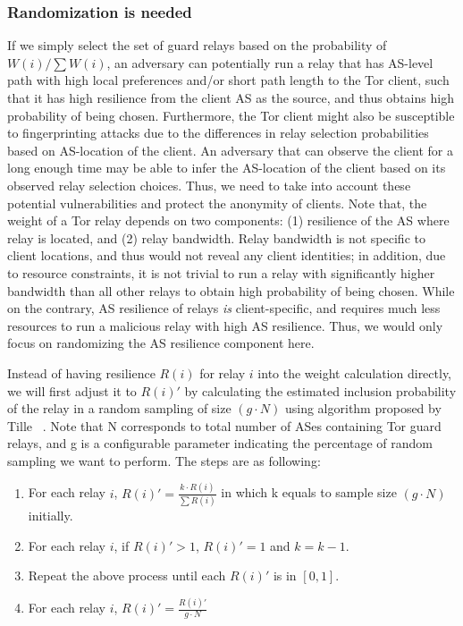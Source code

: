 \subsubsection{Randomization is needed}
\label{relay_randomization}
If we simply select the set of guard relays based on the probability of $W(i)/\sum W(i)$, an adversary can potentially run a relay that has AS-level path with high local preferences and/or short path length to the Tor client, such that it has high resilience from the client AS as the source, and thus obtains high probability of being chosen. Furthermore, the Tor client might also be susceptible to fingerprinting attacks due to the differences in relay selection probabilities based on AS-location of the client. An adversary that can observe the client for a long enough time may be able to infer the AS-location of the client based on its observed relay selection choices. Thus, we need to take into account these potential vulnerabilities and protect the anonymity of clients. Note that, the weight of a Tor relay depends on two components: (1) resilience of the AS where relay is located, and (2) relay bandwidth. Relay bandwidth is not specific to client locations, and thus would not reveal any client identities; in addition, due to resource constraints, it is not trivial to run a relay with significantly higher bandwidth than all other relays to obtain high probability of being chosen. While on the contrary, AS resilience of relays \emph{is} client-specific, and requires much less resources to run a malicious relay with high AS resilience. Thus, we would only focus on randomizing the AS resilience component here. 

Instead of having resilience $R(i)$ for relay $i$ into the weight calculation directly, we will first adjust it to $R(i)\prime$ by calculating the estimated inclusion probability of the relay in a random sampling of size $(g \cdot N)$ using algorithm proposed by Tille ~\cite{tille1996elimination}. Note that N corresponds to total number of ASes containing Tor guard relays, and g is a configurable parameter indicating the percentage of random sampling we want to perform. The steps are as following:
\begin{enumerate}
\item For each relay $i$, $R(i)\prime = \frac {k \cdot R(i)} {\sum R(i)}$ in which k equals to sample size $(g \cdot N)$ initially.
\item For each relay $i$, if $R(i)\prime > 1$, $R(i)\prime = 1$ and $k = k - 1$.
\item Repeat the above process until each $R(i)\prime$ is in $[0,1]$.
\item For each relay $i$, $R(i)\prime = \frac{R(i)\prime} {g \cdot N}$
\end{enumerate}

